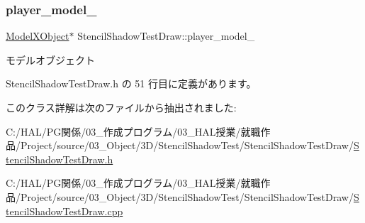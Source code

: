 \subsubsection{\texorpdfstring{player\+\_\+model\+\_\+}{player\_model\_}}
{\footnotesize\ttfamily \mbox{\hyperlink{class_model_x_object}{Model\+X\+Object}}$\ast$ Stencil\+Shadow\+Test\+Draw\+::player\+\_\+model\+\_\+\hspace{0.3cm}{\ttfamily [private]}}



モデルオブジェクト 



 Stencil\+Shadow\+Test\+Draw.\+h の 51 行目に定義があります。



このクラス詳解は次のファイルから抽出されました\+:\begin{DoxyCompactItemize}
\item 
C\+:/\+H\+A\+L/\+P\+G関係/03\+\_\+作成プログラム/03\+\_\+\+H\+A\+L授業/就職作品/\+Project/source/03\+\_\+\+Object/3\+D/\+Stencil\+Shadow\+Test/\+Stencil\+Shadow\+Test\+Draw/\mbox{\hyperlink{_stencil_shadow_test_draw_8h}{Stencil\+Shadow\+Test\+Draw.\+h}}\item 
C\+:/\+H\+A\+L/\+P\+G関係/03\+\_\+作成プログラム/03\+\_\+\+H\+A\+L授業/就職作品/\+Project/source/03\+\_\+\+Object/3\+D/\+Stencil\+Shadow\+Test/\+Stencil\+Shadow\+Test\+Draw/\mbox{\hyperlink{_stencil_shadow_test_draw_8cpp}{Stencil\+Shadow\+Test\+Draw.\+cpp}}\end{DoxyCompactItemize}

